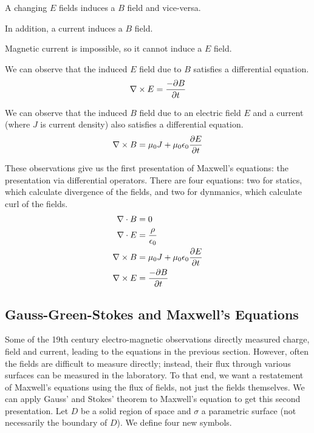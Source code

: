 \documentclass[fleqn,letterpaper]{report}
\begin{document}
\begin{smallitemize}
\item A changing $E$ fields induces a $B$ field and
vice-versa.
\item In addition, a current induces a $B$ field.
\item Magnetic current is impossible, so it cannot induce a
$E$ field.
\item We can observe that the induced $E$ field due to $B$
satisfies a differential equation.
\begin{equation*}
\nabla \times E = \frac{-\partial B}{\partial t} 
\end{equation*}
\item We can observe that the induced $B$ field due to an
electric field $E$ and a current (where $J$ is current
density) also satisfies a differential equation.
\begin{equation*}
\nabla \times B = \mu_0 J + \mu_0 \epsilon_0 \frac{\partial E}{\partial t} 
\end{equation*}
\end{smallitemize}

These observations give us the first presentation of Maxwell's
equations: the presentation via differential operators. There
are four equations: two for statics, which calculate
divergence of the fields, and two for dynmanics, which
calculate curl of the fields.
\begin{align*}
\nabla \cdot B & = 0 \\
\nabla \cdot E & = \frac{\rho}{\epsilon_0} \\
\nabla \times B & = \mu_0 J + \mu_0 \epsilon_0 \frac{\partial E}{
\partial t} \\
\nabla \times E & = \frac{-\partial B}{\partial t}
\end{align*}

\subsection{Gauss-Green-Stokes and Maxwell's Equations}
\label{gauss-green-stokes-maxwell}

Some of the 19th century electro-magnetic observations
directly measured charge, field and current, leading to the
equations in the previous section. However, often the fields
are difficult to measure directly; instead, their flux through
various surfaces can be measured in the laboratory. To that
end, we want a restatement of Maxwell's equations using the
flux of fields, not just the fields themselves.  We can apply
Gauss' and Stokes' theorem to Maxwell's equation to get this
second presentation. Let $D$ be a solid region of space and
$\sigma$ a parametric surface (not necessarily the boundary of
$D$). We define four new symbols.
\end{document}

